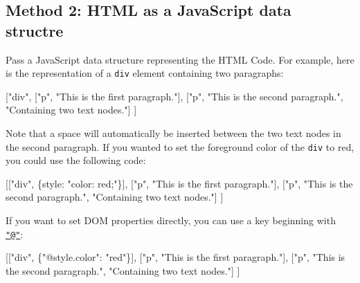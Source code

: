 \documentclass[]{article}
\newenvironment{Shaded}{}{}
\newcommand{\DataTypeTok}[1]{\textcolor[rgb]{0.56,0.13,0.00}{{#1}}}
\newcommand{\StringTok}[1]{\textcolor[rgb]{0.25,0.44,0.63}{{#1}}}
\newcommand{\NormalTok}[1]{{#1}}
\begin{document}
\subsection{Method 2: HTML as a JavaScript data
structre}\label{method-2-html-as-a-javascript-data-structre}

Pass a JavaScript data structure representing the HTML Code. For
example, here is the representation of a \texttt{div} element containing
two paragraphs:

\begin{Shaded}
\begin{Highlighting}[]
    \NormalTok{[}\StringTok{"div"}\NormalTok{,}
        \NormalTok{[}\StringTok{"p"}\NormalTok{, }\StringTok{"This is the first paragraph."}\NormalTok{],}
        \NormalTok{[}\StringTok{"p"}\NormalTok{, }\StringTok{"This is the second paragraph."}\NormalTok{, }\StringTok{"Containing two text nodes."}\NormalTok{]}
    \NormalTok{]}
\end{Highlighting}
\end{Shaded}

Note that a space will automatically be inserted between the two text
nodes in the second paragraph. If you wanted to set the foreground color
of the \texttt{div} to red, you could use the following code:

\begin{Shaded}
\begin{Highlighting}[]
    \NormalTok{[[}\StringTok{"div"}\NormalTok{, \{}\DataTypeTok{style}\NormalTok{: }\StringTok{"color: red;"}\NormalTok{\}],}
        \NormalTok{[}\StringTok{"p"}\NormalTok{, }\StringTok{"This is the first paragraph."}\NormalTok{],}
        \NormalTok{[}\StringTok{"p"}\NormalTok{, }\StringTok{"This is the second paragraph."}\NormalTok{, }\StringTok{"Containing two text nodes."}\NormalTok{]}
    \NormalTok{]}
\end{Highlighting}
\end{Shaded}

If you want to set DOM properties directly, you can use a key beginning
with \href{mailto:"@"}{\nolinkurl{"@"}}:

\begin{Shaded}
\begin{Highlighting}[]
    \NormalTok{[[}\StringTok{"div"}\NormalTok{, \{}\StringTok{"@style.color"}\NormalTok{: }\StringTok{"red"}\NormalTok{\}],}
        \NormalTok{[}\StringTok{"p"}\NormalTok{, }\StringTok{"This is the first paragraph."}\NormalTok{],}
        \NormalTok{[}\StringTok{"p"}\NormalTok{, }\StringTok{"This is the second paragraph."}\NormalTok{, }\StringTok{"Containing two text nodes."}\NormalTok{]}
    \NormalTok{]}
\end{Highlighting}
\end{Shaded}
\end{document}
